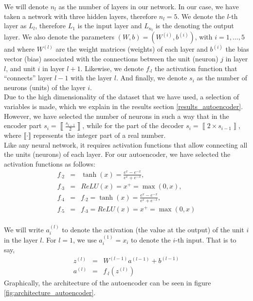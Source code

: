\documentclass{iosart2c}
\begin{document}
We will denote $n_l$ as the number of layers in our network. In our case, we have taken a network with three hidden layers, therefore $n_l=5$. We denote the $l$-th layer as $L_l$, therefore $L_1$ is the input layer and $L_{n_l}$ is the denoting the output layer. We also denote the parameters $(W,b)=(W^{(i)},b^{(i)})$, with $i=1,\ldots,5$ and where $W^{(l)}$ are the weight matrices (weights) of each layer and $b^{(i)}$ the bias vector (bias) associated with the connections between the unit (neuron) $j$ in layer $l$, and unit $i$ in layer $l+1$. Likewise, we denote $f_{\cdot l}$ the activation function that ``connects'' layer $l-1$ with the layer $l$. And finally, we denote $s_i$ as the number of neurons (units) of the layer $i$. \\


Due to the high dimensionality of the dataset that we have used, a selection of variables is made, which we explain in the results section \ref{results_autoencoder}. However, we have selected the number of neurons in such a way that in the encoder part $s_i=\left\llbracket\frac{s_{i-1}}{2}\right\rrbracket$, while for the part of the decoder $s_i=\left\llbracket 2\times s_{i-1} \right\rrbracket$, where $\llbracket \cdot \rrbracket$ represents the integer part of a real number. \\

Like any neural network, it requires activation functions that allow connecting all the units (neurons) of each layer. For our autoencoder, we have selected the activation functions as follows:
\begin{eqnarray*}
f_{\cdot 2} &=& \tanh(x)=\frac{e^{x}-e^{-x}}{ e^{x}+e^{-x}},\\
f_{\cdot 3} &=& ReLU(x) = x^+ = \max(0, x),\\
f_{\cdot 4} &=& f_{\cdot 2} = \tanh(x)=\frac{e^{x}-e^{-x}}{ e^{x}+e^{-x}},\\
f_{\cdot 5} &=& f_{\cdot 3} = ReLU(x) = x^+ = \max(0, x)\\
\end{eqnarray*}

We will write $a_i^{(l)}$ to denote the activation (the value at the output) of the unit $i$ in the layer $l$. For $l=1$, we use $a_i^{(1)}=x_i$ to denote the $i$-th input. That is to say,
\begin{eqnarray*}
z^{(l)}&=&W^{(l-1)}a^{(l-1)}+b^{(l-1)}\\
a^{(l)}&=&f_{\cdot l}(z^{(l)})
\end{eqnarray*}
Graphically, the architecture of the autoencoder can be seen in figure \ref{fig:architecture_autoencoder}. \\
\end{document}
